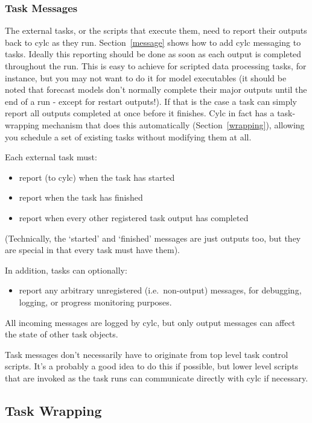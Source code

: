 \documentclass[11pt,a4paper]{article}
\begin{document}
\subsubsection{Task Messages}

The external tasks, or the scripts that execute them, need to report
their outputs back to cylc as they run. Section~\ref{message} shows
how to add cylc messaging to tasks.  Ideally this reporting should be
done as soon as each output is completed throughout the run. This is
easy to achieve for scripted data processing tasks, for instance, but
you may not want to do it for model executables (it should be noted that
forecast models don't normally complete their major outputs until the
end of a run - except for restart outputs!). If that is the case a task
can simply report all outputs completed at once before it finishes.
Cylc in fact has a task-wrapping mechanism that does this automatically
(Section~\ref{wrapping}), allowing you schedule a set of existing
tasks without modifying them at all.  

Each external task must:

\begin{itemize}
\item report (to cylc) when the task has started
\item report when the task has finished
\item report when every other registered task output has
completed
\end{itemize}

(Technically, the `started' and `finished' messages are just
outputs too, but they are special in that every task
must have them).

In addition, tasks can optionally:

\begin{itemize}
\item report any arbitrary unregistered (i.e.\ non-output)
messages, for debugging, logging, or progress monitoring purposes.
\end{itemize}

All incoming messages are logged by cylc, but only output messages can
affect the state of other task objects.

Task messages don't necessarily have to originate from top level task
control scripts. It's a probably a good idea to do this if possible, but
lower level scripts that are invoked as the task runs can communicate
directly with cylc if necessary.

\subsection{Task Wrapping}
\label{TaskWrapping}
\end{document}
